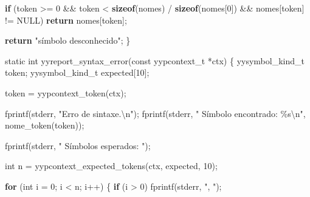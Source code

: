 \documentclass[
  brazilian,
  letterpaper,
]{book}
\newenvironment{Shaded}{\begin{snugshade}}{\end{snugshade}}
\newcommand{\ControlFlowTok}[1]{\textcolor[rgb]{0.00,0.23,0.31}{\textbf{#1}}}
\newcommand{\DataTypeTok}[1]{\textcolor[rgb]{0.68,0.00,0.00}{#1}}
\newcommand{\DecValTok}[1]{\textcolor[rgb]{0.68,0.00,0.00}{#1}}
\newcommand{\KeywordTok}[1]{\textcolor[rgb]{0.00,0.23,0.31}{\textbf{#1}}}
\newcommand{\NormalTok}[1]{\textcolor[rgb]{0.00,0.23,0.31}{#1}}
\newcommand{\OperatorTok}[1]{\textcolor[rgb]{0.37,0.37,0.37}{#1}}
\newcommand{\SpecialCharTok}[1]{\textcolor[rgb]{0.37,0.37,0.37}{#1}}
\newcommand{\StringTok}[1]{\textcolor[rgb]{0.13,0.47,0.30}{#1}}
\theoremstyle{plain}
\theoremstyle{definition}
\theoremstyle{remark}
\begin{document}
\begin{Shaded}
\begin{Highlighting}[]
    \ControlFlowTok{if} \OperatorTok{(}\NormalTok{token }\OperatorTok{\textgreater{}=} \DecValTok{0} \OperatorTok{\&\&}
\NormalTok{        token }\OperatorTok{\textless{}} \KeywordTok{sizeof}\OperatorTok{(}\NormalTok{nomes}\OperatorTok{)} \OperatorTok{/} \KeywordTok{sizeof}\OperatorTok{(}\NormalTok{nomes}\OperatorTok{[}\DecValTok{0}\OperatorTok{])} \OperatorTok{\&\&}
\NormalTok{        nomes}\OperatorTok{[}\NormalTok{token}\OperatorTok{]} \OperatorTok{!=}\NormalTok{ NULL}\OperatorTok{)}
        \ControlFlowTok{return}\NormalTok{ nomes}\OperatorTok{[}\NormalTok{token}\OperatorTok{];}

    \ControlFlowTok{return} \StringTok{"símbolo desconhecido"}\OperatorTok{;}
\OperatorTok{\}}

\DataTypeTok{static} \DataTypeTok{int}\NormalTok{ yyreport\_syntax\_error}\OperatorTok{(}\DataTypeTok{const}\NormalTok{ yypcontext\_t }\OperatorTok{*}\NormalTok{ctx}\OperatorTok{)}
\OperatorTok{\{}
\NormalTok{    yysymbol\_kind\_t token}\OperatorTok{;}
\NormalTok{    yysymbol\_kind\_t expected}\OperatorTok{[}\DecValTok{10}\OperatorTok{];}

\NormalTok{    token }\OperatorTok{=}\NormalTok{ yypcontext\_token}\OperatorTok{(}\NormalTok{ctx}\OperatorTok{);}

\NormalTok{    fprintf}\OperatorTok{(}\NormalTok{stderr}\OperatorTok{,} \StringTok{"Erro de sintaxe.}\SpecialCharTok{\textbackslash{}n}\StringTok{"}\OperatorTok{);}
\NormalTok{    fprintf}\OperatorTok{(}\NormalTok{stderr}\OperatorTok{,} \StringTok{"  Símbolo encontrado: }\SpecialCharTok{\%s\textbackslash{}n}\StringTok{"}\OperatorTok{,}
\NormalTok{            nome\_token}\OperatorTok{(}\NormalTok{token}\OperatorTok{));}

\NormalTok{    fprintf}\OperatorTok{(}\NormalTok{stderr}\OperatorTok{,} \StringTok{"  Símbolos esperados: "}\OperatorTok{);}

    \DataTypeTok{int}\NormalTok{ n }\OperatorTok{=}\NormalTok{ yypcontext\_expected\_tokens}\OperatorTok{(}\NormalTok{ctx}\OperatorTok{,}\NormalTok{ expected}\OperatorTok{,} \DecValTok{10}\OperatorTok{);}

    \ControlFlowTok{for} \OperatorTok{(}\DataTypeTok{int}\NormalTok{ i }\OperatorTok{=} \DecValTok{0}\OperatorTok{;}\NormalTok{ i }\OperatorTok{\textless{}}\NormalTok{ n}\OperatorTok{;}\NormalTok{ i}\OperatorTok{++)} \OperatorTok{\{}
        \ControlFlowTok{if} \OperatorTok{(}\NormalTok{i }\OperatorTok{\textgreater{}} \DecValTok{0}\OperatorTok{)}
\NormalTok{            fprintf}\OperatorTok{(}\NormalTok{stderr}\OperatorTok{,} \StringTok{", "}\OperatorTok{);}


\end{Highlighting}
\end{Shaded}
\end{document}
